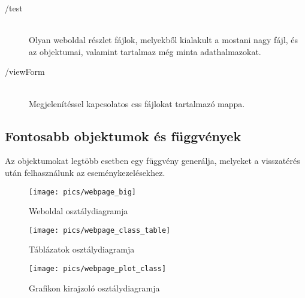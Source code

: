 \begin{description}
		\item[/test] \hfill \\ 
			Olyan weboldal részlet fájlok, melyekből kialakult a mostani nagy fájl, és az objektumai, valamint tartalmaz még minta adathalmazokat.

		\item[/viewForm] \hfill \\ 
			Megjelenítéssel kapcsolatos css fájlokat tartalmazó mappa.
	\end{description}

\subsection{Fontosabb objektumok és függvények}
	\hfill
	Az objektumokat legtöbb esetben egy függvény generálja, melyeket a visszatérés után felhasználunk az eseménykezelésekhez.
	\begin{figure}[h]
		\texttt{[image: pics/webpage\_big]}
		\centering
		\caption{Weboldal osztálydiagramja\label{fig:webpage_big}}
	\end{figure}

	\begin{figure}[h]
		\texttt{[image: pics/webpage\_class\_table]}
		\centering
		\caption{Táblázatok osztálydiagramja\label{fig:webpage_class_table}}
	\end{figure}

	\begin{figure}[h]
		\texttt{[image: pics/webpage\_plot\_class]}
		\centering
		\caption{Grafikon kirajzoló osztálydiagramja\label{fig:webpage_plot_class}}
	\end{figure}

